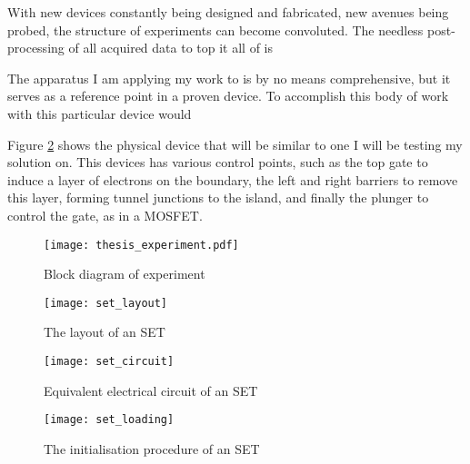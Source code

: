With new devices constantly being designed and fabricated, new avenues being probed, the structure of experiments can become convoluted. The needless post-processing of all acquired data to top it all of is 


The apparatus I am applying my work to is by no means comprehensive, but it serves as a reference point in a proven device. To accomplish this body of work with this particular device would 


Figure \ref{fig::set_layout} shows the physical device that will be similar to one I will be testing my solution on. This devices has various control points, such as the top gate to induce a layer of electrons on the boundary, the left and right barriers to remove this layer, forming tunnel junctions to the island, and finally the plunger to control the gate, as in a MOSFET.

\begin{figure}[htbp!]
	\centering
	\texttt{[image: thesis\_experiment.pdf]}
	\caption{Block diagram of experiment}
	\label{fig::thesis_experiment}
\end{figure}

\begin{figure}[htbp!]
	\centering
	\texttt{[image: set\_layout]}
	\caption{The layout of an SET}
	\label{fig::set_layout}
\end{figure}

\begin{figure}[htbp!]
	\centering
	\texttt{[image: set\_circuit]}
	\caption{Equivalent electrical circuit of an SET}
	\label{fig::set_circuit}
\end{figure}

\begin{figure}[htbp!]
	\centering
	\texttt{[image: set\_loading]}
	\caption{The initialisation procedure of an SET}
	\label{fig::set_loading}
\end{figure}